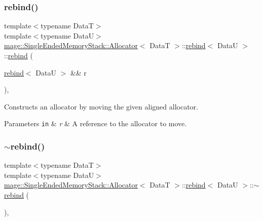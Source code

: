 \subsubsection{\texorpdfstring{rebind()}{rebind()}\hspace{0.1cm}{\footnotesize\ttfamily [3/3]}}
{\footnotesize\ttfamily template$<$typename DataT$>$ \\
template$<$typename DataU$>$ \\
\hyperlink{structmage_1_1_single_ended_memory_stack_1_1_allocator}{mage\+::\+Single\+Ended\+Memory\+Stack\+::\+Allocator}$<$ DataT $>$\+::\hyperlink{structmage_1_1_single_ended_memory_stack_1_1_allocator_1_1rebind}{rebind}$<$ DataU $>$\+::\hyperlink{structmage_1_1_single_ended_memory_stack_1_1_allocator_1_1rebind}{rebind} (\begin{DoxyParamCaption}\item[{\hyperlink{structmage_1_1_single_ended_memory_stack_1_1_allocator_1_1rebind}{rebind}$<$ DataU $>$ \&\&}]{r }\end{DoxyParamCaption})\hspace{0.3cm}{\ttfamily [private]}, {\ttfamily [delete]}}

Constructs an allocator by moving the given aligned allocator.


\begin{DoxyParams}[1]{Parameters}
\mbox{\tt in}  & {\em r} & A reference to the allocator to move. \\
\hline
\end{DoxyParams}
\hypertarget{structmage_1_1_single_ended_memory_stack_1_1_allocator_1_1rebind_ac5560de51fdd40828b0b82f7975199d1}{}\label{structmage_1_1_single_ended_memory_stack_1_1_allocator_1_1rebind_ac5560de51fdd40828b0b82f7975199d1} 
\subsubsection{\texorpdfstring{$\sim$rebind()}{~rebind()}}
{\footnotesize\ttfamily template$<$typename DataT$>$ \\
template$<$typename DataU$>$ \\
\hyperlink{structmage_1_1_single_ended_memory_stack_1_1_allocator}{mage\+::\+Single\+Ended\+Memory\+Stack\+::\+Allocator}$<$ DataT $>$\+::\hyperlink{structmage_1_1_single_ended_memory_stack_1_1_allocator_1_1rebind}{rebind}$<$ DataU $>$\+::$\sim$\hyperlink{structmage_1_1_single_ended_memory_stack_1_1_allocator_1_1rebind}{rebind} (\begin{DoxyParamCaption}{ }\end{DoxyParamCaption})\hspace{0.3cm}{\ttfamily [private]}, {\ttfamily [delete]}}

